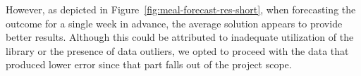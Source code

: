 However, as depicted in Figure~\ref{fig:meal-forecast-res-short}, when forecasting the outcome for a single week in advance, the average solution appears to provide better results. Although this could be attributed to inadequate utilization of the library or the presence of data outliers, we opted to proceed with the data that produced lower error since that part falls out of the project scope.
